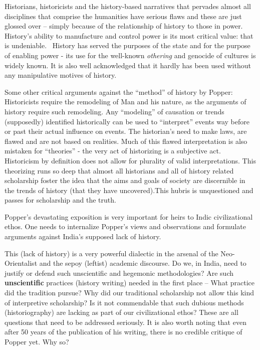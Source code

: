 Historians, historicists and the history-based narratives that pervades almost all disciplines that comprise the humanities have serious flaws and these are just glossed over – simply because of the relationship of history to those in power. History’s ability to manufacture and control power is its most critical value: that is undeniable.  History has served the purposes of the state and for the purpose of enabling power - its use for the well-known \textit{othering} and genocide of cultures is widely known. It is also well acknowledged that it hardly has been used without any manipulative motives of history.

Some other critical arguments against the “method” of history by Popper: Historicists require the remodeling of Man and his nature, as the arguments of history require such remodeling. Any “modeling” of causation or trends (supposedly) identified historically can be used to “interpret” events way before or past their actual influence on events. The historian’s need to make laws, are flawed and are not based on realities. Much of this flawed interpretation is also mistaken for “theories” - the very act of historizing is a subjective act. Historicism by definition does not allow for plurality of valid interpretations. This theorizing runs so deep that almost all historians and all of history related scholarship foster the idea that the aims and goals of society are discernible in the trends of history (that they have uncovered).This hubris is unquestioned and passes for scholarship and the truth.

Popper’s devastating exposition is very important for heirs to Indic civilizational ethos. One needs to internalize Popper’s views and observations and formulate arguments against India’s supposed lack of history.

This (lack of history) is a very powerful dialectic in the arsenal of the Neo-Orientalist and the sepoy (leftist) academic discourse. Do we, in India, need to justify or defend such unscientific and hegemonic methodologies? Are such \textbf{unscientific} practices (history writing) needed in the first place – What practice did the tradition pursue? Why did our traditional scholarship not allow this kind of interpretive scholarship? Is it not commendable that such dubious methods (historiography) are lacking as part of our civilizational ethos? These are all questions that need to be addressed seriously. It is also worth noting that even after 50 years of the publication of his writing, there is no credible critique of Popper yet. Why so?


